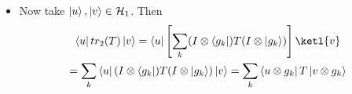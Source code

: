 \documentclass[a4paper, 11pt]{article}
\begin{document}
{\begin{itemize}
\begin{align*}
			tr_2(T) & = tr_2\lt( \sum\limits_{i,j}\gm_{i,j}A_i\tensor B_j \rt)=\sum\limits_{i,j}\gm_{i,j}tr_2(A_i\tensor B_j)\\
			& = \sum\limits_{i,j}\gm_{i,j}A_i tr( B_j)\\
			& = \sum_{i,j}A_i\sum_k\bra{g_k}B_j\ket{g_k}\\
			& = \sum_{i,j}\sum_k\gm_{i,j}(I\tensor \bra{g_k})A_i\tensor B_j(I\tensor \ket{g_K})\\
			& = \sum_k(I\tensor \bra{g_k})\lt[ \sum_{i,j}\gm_{i,j}A_i\tensor B_j\rt](I\tensor \ket{g_K})\\
			& = \sum_k(I\tensor \bra{g_k})T(I\tensor \ket{g_k})
		\end{align*}So if we get two different representations of $T$, $T=\sum\limits_{i,j}\gm_{i,j}A_i\tensor B_j$ and $T=\sum\limits_{i,j}\gm'_{i,j}A_i'\tensor B_j'$ still for each of them $tr_2(T)$ will be same since it doesn't matter which representation is finally taken. Therefore $tr_2(T)$ is well defined.
		\item  Now take $\ket{u},\ket{v}\in \mathcal{H}_1$. Then \begin{multline*}
			\bra{u}tr_2(T)\ket{v}=\bra{u}\lt[\sum_k(I\tensor \bra{g_k})T(I\tensor \ket{g_k}) \rt]\ketl{v}\\
			= \sum_k\bra{u}(I\tensor \bra{g_k})T(I\tensor \ket{ g_k})\ket{v}=\sum_k\bra{u\tensor g_k}T \ket{v\tensor g_k}
		\end{multline*}
	\end{itemize}
}

\end{document}
